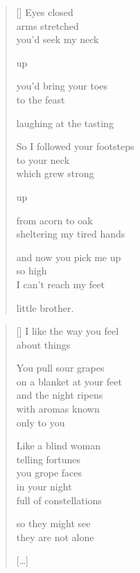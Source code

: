 \documentclass[14pt]{extbook}
\newcommand*{\centeredornament}{\centerline{\pgfornament[width=6cm]{88}}}
\begin{document}

\newpage

\vspace*{-15mm}
\centeredornament
\vspace*{-7mm}


\settowidth{\versewidth}{So I followed your footsteps}

\begin{verse}[\versewidth]
  Eyes closed \\
  arms stretched \\
  you'd seek my neck

  up

  you'd bring your toes \\
  to the feast

  laughing at the tasting

  So I followed your footsteps \\
  to your neck \\
  which grew strong

  up

  from acorn to oak \\
  sheltering my tired hands

  and now you pick me up \\
  so high \\
  I can't reach my feet

  little brother.
\end{verse}



\newpage

\vspace*{-15mm}
\centeredornament
\vspace*{-7mm}


\settowidth{\versewidth}{on a blanket at your feet}

\begin{verse}[\versewidth]
  I like the way you feel \\
  about things

  You pull sour grapes \\
  on a blanket at your feet \\
  and the night ripens \\
  with aromas known \\
  only to you

  Like a blind woman \\
  telling fortunes \\
  you grope faces \\
  in your night \\
  full of constellations

  so they might see \\
  they are not alone

  \hfill [\ldots]
\end{verse}
\end{document}
